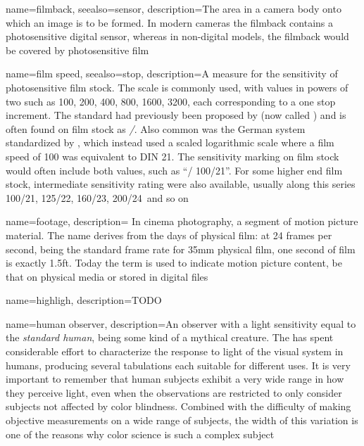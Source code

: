 {
	name=filmback,
	seealso={sensor},
	description={The area in a camera body onto which an image is to be formed. 
		In modern cameras the filmback contains a photosensitive digital sensor,
		whereas in non-digital models, the filmback would be covered by 
		photosensitive film}
}


{
	name={film speed},
	seealso={stop},
	description={A measure for the sensitivity of photosensitive film stock. 
		The  scale is commonly used, with values in powers of two such 
		as 100, 200, 400, 800, 1600, 3200, each corresponding to a one stop increment. 
		The standard had previously been proposed by 
		(now called ) and is often found on film stock as 
		\textsl{/}. 
		Also common was the German system standardized by , which instead 
		used a scaled logarithmic scale where a film speed of  100 was equivalent 
		to DIN 21\degree. 
		The sensitivity marking on film stock would often include both values, 
		such as ``/ 100/21\degree''. 
		For some higher end film stock, intermediate
		sensitivity rating were also available, usually along this series
		100/21\degree, 125/22\degree, 160/23\degree, 200/24\degree\ and so on}
}

{
	name=footage,
	description={
		In cinema photography, a segment of motion picture material. The name derives from
	    the days of physical film: at 24 frames per second, being the standard frame rate for
    	35\unit{\milli\meter} physical film, one second of film is exactly 1.5ft.
    	Today the term is used to indicate motion picture content, be that on physical
        media or stored in digital files}
}

{
	name=highligh,
	description={TODO}
}

{    
	name={human observer},
	description={An observer with a light sensitivity equal to the \textsl{standard human},
		being some kind of a mythical creature.
		The  has spent considerable effort to characterize the response to light 
		of the visual system in humans, producing several tabulations each suitable for
		different uses. 
		It is very important to remember that human subjects exhibit a very wide range 
		in how they perceive light, even when the observations are restricted to only 
		consider subjects not affected by color blindness.
		Combined with the difficulty of making objective measurements on a wide range 
		of subjects, the width of this variation is one of the reasons why color science is
		such a complex subject}
}

